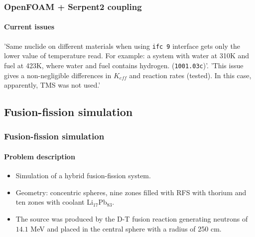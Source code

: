 \documentclass[svgnames,smaller,table]{beamer}
\begin{document}
\begin{frame}[fragile] %
  \frametitle{OpenFOAM + Serpent2 coupling}
  \framesubtitle{Current issues}  
  'Same nuclide on different materials when using \texttt{ifc 9} interface gets only the lower value
  of temperature read. For example: a system with water at 310K and fuel at 423K, where water and fuel
  contains hydrogen. (\texttt{1001.03c})'.
  \vspace{10px}
  'This issue gives a non-negligible differences in $K_{eff}$ and reaction rates (tested). In this case,
  apparently, TMS was not used.'
\end{frame}



\subsection{Fusion-fission simulation}

\begin{frame}
  \frametitle{Fusion-fission simulation}
  \framesubtitle{Problem description}
  \begin{itemize}
  \item Simulation of a hybrid fusion-fission system.
  \item Geometry: concentric spheres, nine zones filled with RFS with thorium and ten zones with coolant Li$_{17}$Pb$_{83}$.
  \item The source was produced by the D-T fusion reaction generating neutrons of $14.1$ MeV and placed in the central sphere with a radius of 250 cm.
  \end{itemize}
\end{frame}
\end{document}
